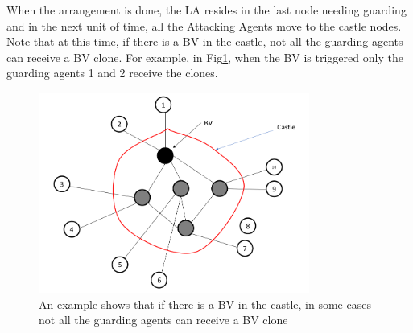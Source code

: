 When the arrangement is done, the LA resides in the last node needing guarding and in the next unit of time, all the Attacking Agents move to the castle nodes. Note that at this time, if there is a BV in the castle, not all the guarding agents can receive a BV clone. For example,   in Fig\ref{fig:MultiCastleNode}, when the BV is triggered only the guarding agents 1 and 2 receive the clones.
\begin{figure}[H]
\centering  
\includegraphics[width=3.5in]{figures/MultiCastleNode.png}
\caption{An example shows that if there is a BV in the castle, in some cases not all the guarding agents can receive a BV clone}\label{fig:MultiCastleNode}
\end{figure} 


